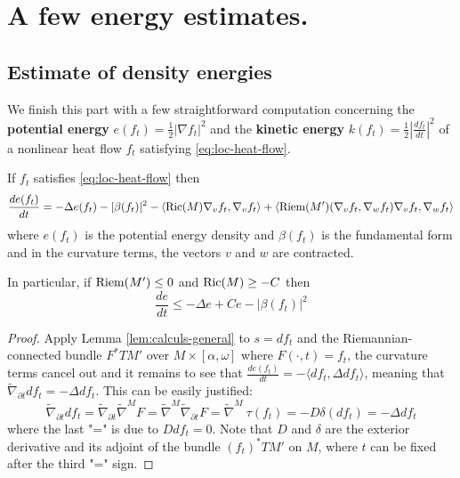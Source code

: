 \section{A few energy estimates.}
\label{sec:org1f4fa53}
\subsection{Estimate of density energies}
\label{sec:org3c01090}
We finish this part with a few straightforward computation concerning the \textbf{potential
energy} \(e(f_t) = \frac{1}{2}|\nabla f_t|^2\) and the \textbf{kinetic energy} \(k(f_t) =
\frac{1}{2}|\frac{d f_t}{d t}|^2\) of a nonlinear heat flow \(f_t\)
satisfying \eqref{eq:loc-heat-flow}.

\begin{theorem}
\label{thm:den-pot}
If \(f_t\) satisfies \eqref{eq:loc-heat-flow} then 
\[
 \frac{d e(f_t)}{dt}= -\Delta e(f_t) - |\beta(f_t)|^2 - \left\langle \mathop{\rm Ric}\nolimits(M) \nabla_v
f_t,\nabla_v f_t \rangle + \langle \mathop{\rm Riem}\nolimits(M') (\nabla_v f_t,\nabla_w f_t)\nabla_v
f_t,\nabla_w f_t \right\rangle
\]
where \(e(f_t)\) is the potential energy density and \(\beta(f_t)\) is the fundamental
form and in the curvature terms, the vectors \(v\) and \(w\) are contracted.

In particular, if  \(\mathop{\rm Riem}\nolimits(M') \leq 0\) and \(\mathop{\rm Ric}\nolimits(M)\geq -C\) then
\begin{equation}
\label{eq:den-pot-est}
\frac{d e}{dt} \leq -\Delta e + Ce - |\beta(f_t)|^2
\end{equation}
\end{theorem}
\begin{proof}
Apply Lemma \ref{lem:calculs-general} to \(s = d f_t\) and the Riemannian-connected
bundle \(F^* TM'\) over \(M\times [\alpha,\omega]\) where \(F(\cdot,t) = f_t\), the curvature terms cancel
out and it remains to see that
\(\frac{d e(f_t)}{dt}= - \langle df_t, \Delta df_t \rangle\), meaning that \(\tilde \nabla_{\partial t} df_t = -\Delta df_t\). This can be easily
justified:
\[
\tilde \nabla_{\partial t} df_t = \tilde \nabla_{\partial t} \tilde\nabla^M F=  \tilde\nabla^M
\tilde\nabla_{\partial t} F= \tilde\nabla^M\ \tau (f_t) = -D\delta (df_t) = -\Delta df_t
\]
where the last "=" is due to \(D df_t = 0\). Note that \(D\) and \(\delta\)
are the exterior derivative and its adjoint of the bundle \((f_t)^*TM'\) on \(M\),
where \(t\) can be fixed after the third "=" sign.
\end{proof}

